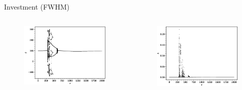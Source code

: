 \documentclass{beamer}
\begin{document}
\begin{frame}{Investment (FWHM)}
	\begin{columns}
	\begin{column}{0.5\textwidth}
		\begin{figure}
			\centering
			\includegraphics[width=1.2\textwidth]{vbifurcation.eps}
		\end{figure}
	\end{column}
	\begin{column}{0.5\textwidth}
		\begin{figure}
			\centering
			\includegraphics[width=1.2\textwidth]{vlyplot.eps}
		\end{figure}
	\end{column}
	\end{columns}
\end{frame}
\end{document}
